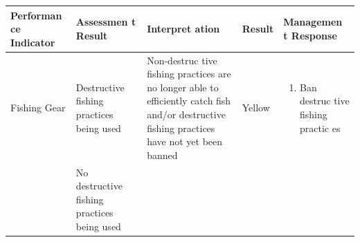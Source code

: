 \documentclass[]{book}
\providecommand{\tightlist}{%
  \setlength{\itemsep}{0pt}\setlength{\parskip}{0pt}}
\begin{document}
\begin{longtable}[]{@{}lllll@{}}
\toprule
\begin{minipage}[b]{0.17\columnwidth}\raggedright\strut
\textbf{Performan ce Indicator}\strut
\end{minipage} & \begin{minipage}[b]{0.17\columnwidth}\raggedright\strut
\textbf{Assessmen t Result}\strut
\end{minipage} & \begin{minipage}[b]{0.17\columnwidth}\raggedright\strut
\textbf{Interpret ation}\strut
\end{minipage} & \begin{minipage}[b]{0.17\columnwidth}\raggedright\strut
\textbf{Result}\strut
\end{minipage} & \begin{minipage}[b]{0.17\columnwidth}\raggedright\strut
\textbf{Managemen t Response}\strut
\end{minipage}\tabularnewline
\midrule
\endhead
\begin{minipage}[t]{0.19\columnwidth}\raggedright\strut
Fishing Gear\strut
\end{minipage} & \begin{minipage}[t]{0.19\columnwidth}\raggedright\strut
Destructive fishing practices being used\strut
\end{minipage} & \begin{minipage}[t]{0.19\columnwidth}\raggedright\strut
Non-destruc tive fishing practices are no longer able to efficiently
catch fish and/or destructive fishing practices have not yet been
banned\strut
\end{minipage} & \begin{minipage}[t]{0.19\columnwidth}\raggedright\strut
Yellow\strut
\end{minipage} & \begin{minipage}[t]{0.19\columnwidth}\raggedright\strut
\begin{enumerate}
\def\labelenumi{\arabic{enumi}.}
\tightlist
\item
  Ban destruc tive fishing practic es
\end{enumerate}\strut
\end{minipage}\tabularnewline
\begin{minipage}[t]{0.19\columnwidth}\raggedright\strut
\strut
\end{minipage} & \begin{minipage}[t]{0.19\columnwidth}\raggedright\strut
No destructive fishing practices being used\strut
\end{minipage} & \begin{minipage}[t]{0.19\columnwidth}\raggedright\strut

\end{minipage}
\end{longtable}
\end{document}
